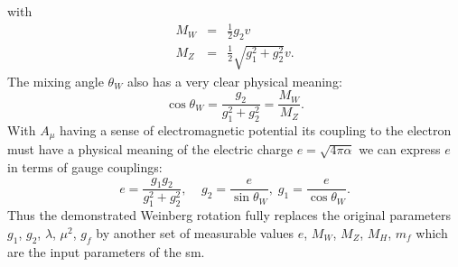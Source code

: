 with
\begin{equation}
\begin{array}{lll} 
M_W &= & \frac{1}{2} g_2 v\\ 
M_Z &=& \frac{1}{2} \sqrt{g_1^2+g_2^2} v.
\end{array} 
\end{equation}
The mixing angle $\theta_W$ also has a very clear physical meaning:
\begin{equation}
\cos{\theta_W}=\frac{g_2}{g_1^2+g_2^2}=\frac{M_W}{M_Z}.
\end{equation}
With $A_{\mu}$ having a sense of electromagnetic potential its coupling to the electron must have a physical meaning of the electric charge $e=\sqrt{4\pi\alpha}$ we can express $e$ in terms of gauge couplings:
\begin{equation}
e=\frac{g_1 g_2}{g_1^2+g_2^2}, \;\;\;\;g_2=\frac{e}{\sin{\theta_W}},\;g_1=\frac{e}{\cos{\theta_W}} .
\end{equation}
Thus the demonstrated Weinberg rotation fully replaces the original parameters $g_1$, $g_2$, $\lambda$, $\mu^2$, $g_f$ by another set of measurable values $e$, $M_W$, $M_Z$, $M_H$, $m_f$ which are the input parameters of the \gls{sm}.
